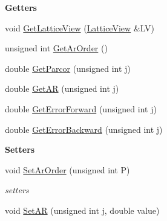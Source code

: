 \begin{Indent}\textbf{ Getters}\par
\begin{DoxyCompactItemize}
\item 
void \hyperlink{classtsa_1_1_ar_burg_estimator_a06b9a3daeecfcc31d6c5e617848ee200}{Get\+Lattice\+View} (\hyperlink{classtsa_1_1_lattice_view}{Lattice\+View} \&LV)
\item 
unsigned int \hyperlink{classtsa_1_1_ar_burg_estimator_a61a8a96608a0d354a1dd942cdf71c669}{Get\+Ar\+Order} ()
\item 
double \hyperlink{classtsa_1_1_ar_burg_estimator_abfbc945d2915208835f1bce7062a14c4}{Get\+Parcor} (unsigned int j)
\item 
double \hyperlink{classtsa_1_1_ar_burg_estimator_ae896885d9fcc18375eb2d3c00f3ceec7}{Get\+AR} (unsigned int j)
\item 
double \hyperlink{classtsa_1_1_ar_burg_estimator_a63e4fbfbd1245e1a899cc783c77f5bfd}{Get\+Error\+Forward} (unsigned int j)
\item 
double \hyperlink{classtsa_1_1_ar_burg_estimator_ae12190c986e02299da186dc29e97cded}{Get\+Error\+Backward} (unsigned int j)
\end{DoxyCompactItemize}
\end{Indent}
\begin{Indent}\textbf{ Setters}\par
\begin{DoxyCompactItemize}
\item 
void \hyperlink{classtsa_1_1_ar_burg_estimator_acbf9046f1ff3d7e2852ec4daa30ac8af}{Set\+Ar\+Order} (unsigned int P)
\begin{DoxyCompactList}\small\item\em setters \end{DoxyCompactList}\item 
void \hyperlink{classtsa_1_1_ar_burg_estimator_ae3873be61a19beab0b5b6e915c594889}{Set\+AR} (unsigned int j, double value)
\end{DoxyCompactItemize}
\end{Indent}
